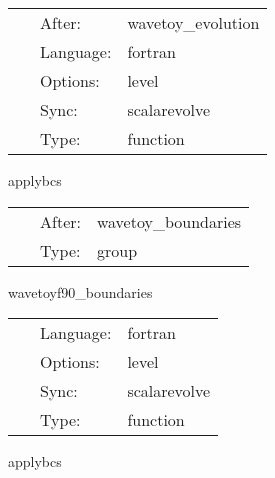 \hspace{5mm}

 \begin{tabular*}{160mm}{cll} 
~ & After:  & wavetoy\_evolution \\ 
~ & Language:  & fortran \\ 
~ & Options:  & level \\ 
~ & Sync:  & scalarevolve \\ 
~ & Type:  & function \\ 
\end{tabular*} 


\vspace{5mm}


\hspace{5mm} applybcs 

\hspace{5mm}{\it apply boundary conditions } 


\hspace{5mm}

 \begin{tabular*}{160mm}{cll} 
~ & After:  & wavetoy\_boundaries \\ 
~ & Type:  & group \\ 
\end{tabular*} 


\vspace{5mm}


\hspace{5mm} wavetoyf90\_boundaries 

\hspace{5mm}{\it boundaries of 3d wave equation } 


\hspace{5mm}

 \begin{tabular*}{160mm}{cll} 
~ & Language:  & fortran \\ 
~ & Options:  & level \\ 
~ & Sync:  & scalarevolve \\ 
~ & Type:  & function \\ 
\end{tabular*} 


\vspace{5mm}


\hspace{5mm} applybcs 

